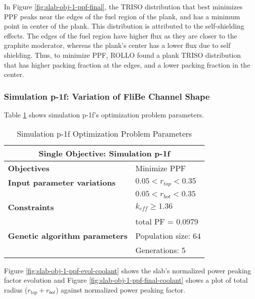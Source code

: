 In Figure \ref{fig:slab-obj-1-ppf-final}, the TRISO distribution that best minimizes 
PPF peaks near the edges of the fuel region of the plank, and has a minimum point in 
center of the plank.
This distribution is attributed to the self-shielding effects. 
The edges of the fuel region have higher flux as they are closer to the graphite 
moderator, whereas the plank's center has a lower flux due to self shielding. 
Thus, to minimize PPF, \gls{ROLLO} found a plank TRISO distribution that has higher 
packing fraction at the edges, and a lower packing fraction in the center. 

\subsubsection{Simulation p-1f: Variation of FliBe Channel Shape}
Table \ref{tab:simulationp1f} shows simulation p-1f's optimization problem parameters. 
\begin{table}[htbp]
    \centering
    \onehalfspacing
    \caption{Simulation p-1f Optimization Problem Parameters}
	\label{tab:simulationp1f}
    \footnotesize
    \begin{tabular}{l|p{3cm}}
    \hline 
    \multicolumn{2}{c}{\textbf{Single Objective: Simulation p-1f}} \\
    \hline 
    \textbf{Objectives} & Minimize PPF \\
    \hline 
    \textbf{Input parameter variations} & $0.05<r_{top}<0.35$ \\
    & $0.05<r_{bot}<0.35$ \\
    \hline
    \textbf{Constraints} & $k_{eff} \geq 1.36$\\ 
    & total PF = 0.0979\\
    \hline 
    \textbf{Genetic algorithm parameters} & Population size: 64 \\
    & Generations: 5 \\
    \hline
    \end{tabular}
\end{table}
Figure \ref{fig:slab-obj-1-ppf-evol-coolant} shows the slab's normalized power peaking 
factor evolution and Figure \ref{fig:slab-obj-1-ppf-final-coolant} shows a plot of total 
radius ($r_{top} + r_{bot}$) against normalized power peaking factor. 
